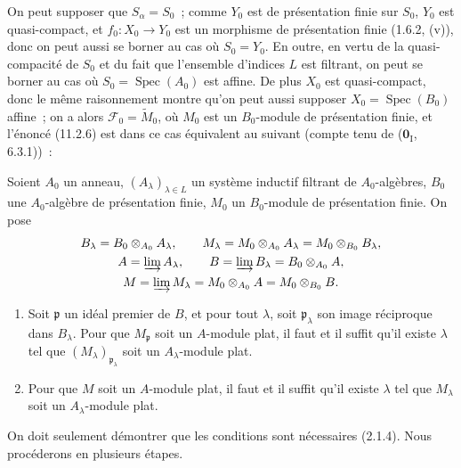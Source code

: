 On peut supposer que $S_\alpha=S_0$~; comme $Y_0$ est de présentation finie
sur $S_0$, $Y_0$ est quasi-compact, et $f_0:X_0\to Y_0$ est un morphisme de
présentation finie (1.6.2, (v)), donc on peut aussi se borner au cas où
$S_0=Y_0$. En outre, en vertu de la quasi-compacité de $S_0$ et du fait que
l'ensemble d'indices $L$ est filtrant, on peut se borner au cas où
$S_0=\operatorname{Spec}(A_0)$ est affine. De plus $X_0$ est quasi-compact,
donc le même raisonnement montre qu'on peut aussi supposer
$X_0=\operatorname{Spec}(B_0)$ affine~; on a alors
$\mathcal F_0=\widetilde M_0$, où $M_0$ est un $B_0$-module de présentation
finie, et l'énoncé (11.2.6) est dans ce cas équivalent au suivant (compte tenu
de ($\mathbf 0_{\mathrm I}$, 6.3.1))~:

\begin{corollary}[11.2.6.1]
\label{IV.11.2.6.1-fr}
Soient $A_0$ un anneau, $(A_\lambda)_{\lambda\in L}$ un système inductif
filtrant de $A_0$-algèbres, $B_0$ une $A_0$-algèbre de présentation finie,
$M_0$ un $B_0$-module de présentation finie. On pose
\[
\begin{gathered}
B_\lambda=B_0\otimes_{A_0}A_\lambda,\qquad
M_\lambda=M_0\otimes_{A_0}A_\lambda=M_0\otimes_{B_0}B_\lambda,\\
A=\varinjlim A_\lambda,\qquad
B=\varinjlim B_\lambda=B_0\otimes_{A_0}A,\\
M=\varinjlim M_\lambda=M_0\otimes_{A_0}A=M_0\otimes_{B_0}B.
\end{gathered}
\]
\begin{enumerate}[label=\emph{(\roman*)}]
\item Soit $\mathfrak p$ un idéal premier de $B$, et pour tout $\lambda$,
soit $\mathfrak p_\lambda$ son image réciproque dans $B_\lambda$. Pour que
$M_{\mathfrak p}$ soit un $A$-module plat, il faut et il suffit qu'il existe
$\lambda$ tel que $(M_\lambda)_{\mathfrak p_\lambda}$ soit un
$A_\lambda$-module plat.
\item Pour que $M$ soit un $A$-module plat, il faut et il suffit qu'il existe
$\lambda$ tel que $M_\lambda$ soit un $A_\lambda$-module plat.
\end{enumerate}
\end{corollary}

On doit seulement démontrer que les conditions sont nécessaires (2.1.4).
Nous procéderons en plusieurs étapes.

